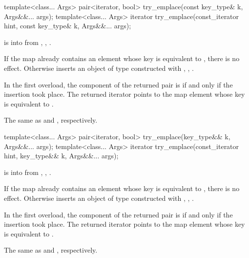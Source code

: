%
\begin{itemdecl}
template<class... Args>
  pair<iterator, bool> try_emplace(const key_type& k, Args&&... args);
template<class... Args>
  iterator try_emplace(const_iterator hint, const key_type& k, Args&&... args);
\end{itemdecl}

\begin{itemdescr}
\pnum
\expects
{} is  into 
from , ,
.

\pnum
\effects
If the map already contains an element
whose key is equivalent to ,
there is no effect.
Otherwise inserts an object of type 
constructed with , ,
.

\pnum
\returns
In the first overload,
the  component of the returned pair is 
if and only if the insertion took place.
The returned iterator points to the map element
whose key is equivalent to .

\pnum
\complexity
The same as  and ,
respectively.
\end{itemdescr}

%
\begin{itemdecl}
template<class... Args>
  pair<iterator, bool> try_emplace(key_type&& k, Args&&... args);
template<class... Args>
  iterator try_emplace(const_iterator hint, key_type&& k, Args&&... args);
\end{itemdecl}

\begin{itemdescr}
\pnum
\expects
{} is  into 
from , ,
.

\pnum
\effects
If the map already contains an element
whose key is equivalent to ,
there is no effect.
Otherwise inserts an object of type 
constructed with , ,
.

\pnum
\returns
In the first overload,
the  component of the returned pair is 
if and only if the insertion took place.
The returned iterator points to the map element
whose key is equivalent to .

\pnum
\complexity
The same as  and ,
respectively.
\end{itemdescr}

